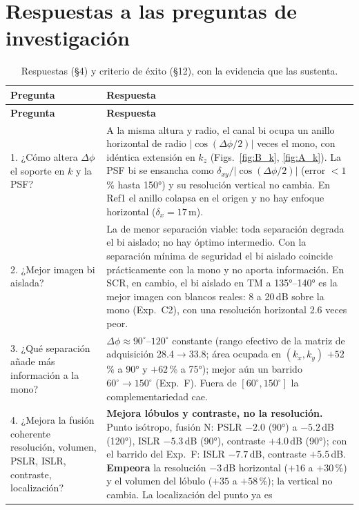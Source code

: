 \chapter{Respuestas a las preguntas de investigación}
\label{cap:respuestas}

\begin{longtable}{@{}L{4.3cm}L{10.2cm}@{}}
\caption{Respuestas (§4) y criterio de éxito (§12), con la evidencia que las sustenta.}
\label{tab:respuestas}\\
\toprule
\textbf{Pregunta} & \textbf{Respuesta} \\
\midrule
\endfirsthead
\toprule
\textbf{Pregunta} & \textbf{Respuesta} \\
\midrule
{}. ¿Cómo altera $\Delta\phi$ el soporte en $k$ y la PSF? &
A la misma altura y radio, el canal bi ocupa un anillo horizontal de radio
$|\cos(\Delta\phi/2)|$ veces el mono, con idéntica extensión en $k_z$
(Figs.~\ref{fig:B_k}, \ref{fig:A_k}). La PSF bi se ensancha como
$\delta_{xy}/|\cos(\Delta\phi/2)|$ (error $<1$\,\% hasta 150°) y su resolución
vertical no cambia. En Ref1 el anillo colapsa en el origen y no hay
enfoque horizontal ($\delta_x=17$\,m). \\
2. ¿Mejor imagen bi aislada? &
La de menor separación viable: toda separación degrada el bi aislado; no hay
óptimo intermedio. Con la separación mínima de seguridad el bi aislado
coincide prácticamente con la mono y no aporta información. En SCR, en cambio, el bi aislado
en TM a 135°--140° es la mejor imagen con blancos reales: 8 a 20\,dB sobre la mono (Exp.~C2),
con una resolución horizontal 2.6 veces peor. \\
3. ¿Qué separación añade más información a la mono? &
$\Delta\phi\approx90^{\circ}$--$120^{\circ}$ constante (rango efectivo de la matriz de
adquisición 28.4$\to$33.8; área ocupada en $(k_x,k_y)$ $+52$\,\% a 90° y $+62$\,\% a 75°); mejor aún un barrido
$60^{\circ}\to150^{\circ}$ (Exp.~F). Fuera de $[60^{\circ},150^{\circ}]$ la complementariedad cae. \\
4. ¿Mejora la fusión coherente resolución, volumen, PSLR, ISLR, contraste, localización? &
\textbf{Mejora lóbulos y contraste, no la resolución.} Punto isótropo,
fusión N: PSLR $-2.0$ (90°) a $-5.2$\,dB (120°), ISLR $-5.3$\,dB (90°), contraste
$+4.0$\,dB (90°); con el barrido del Exp.~F: ISLR $-7.7$\,dB, contraste $+5.5$\,dB.
\textbf{Empeora} la resolución $-3$\,dB horizontal ($+16$ a $+30$\,\%) y el volumen
del lóbulo ($+35$ a $+58$\,\%); la vertical no cambia. La localización del punto ya es

\end{longtable}
